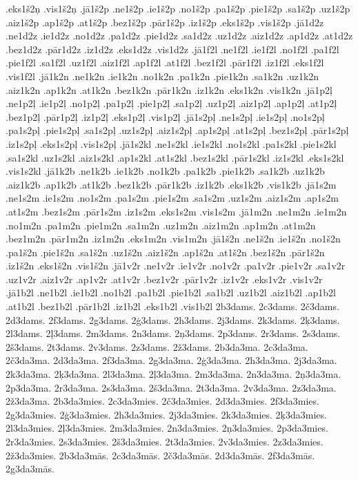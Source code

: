 {.eks1š2ņ
.vis1š2ņ
.jā1š2p
.ne1š2p
.ie1š2p
.no1š2p
.pa1š2p
.pie1š2p
.sa1š2p
.uz1š2p
.aiz1š2p
.ap1š2p
.at1š2p
.bez1š2p
.pār1š2p
.iz1š2p
.eks1š2p
.vis1š2p
.jā1d2z
.ne1d2z
.ie1d2z
.no1d2z
.pa1d2z
.pie1d2z
.sa1d2z
.uz1d2z
.aiz1d2z
.ap1d2z
.at1d2z
.bez1d2z
.pār1d2z
.iz1d2z
.eks1d2z
.vis1d2z
.jā1f2l
.ne1f2l
.ie1f2l
.no1f2l
.pa1f2l
.pie1f2l
.sa1f2l
.uz1f2l
.aiz1f2l
.ap1f2l
.at1f2l
.bez1f2l
.pār1f2l
.iz1f2l
.eks1f2l
.vis1f2l
.jā1k2n
.ne1k2n
.ie1k2n
.no1k2n
.pa1k2n
.pie1k2n
.sa1k2n
.uz1k2n
.aiz1k2n
.ap1k2n
.at1k2n
.bez1k2n
.pār1k2n
.iz1k2n
.eks1k2n
.vis1k2n
.jā1p2ļ
.ne1p2ļ
.ie1p2ļ
.no1p2ļ
.pa1p2ļ
.pie1p2ļ
.sa1p2ļ
.uz1p2ļ
.aiz1p2ļ
.ap1p2ļ
.at1p2ļ
.bez1p2ļ
.pār1p2ļ
.iz1p2ļ
.eks1p2ļ
.vis1p2ļ
.jā1s2pļ
.ne1s2pļ
.ie1s2pļ
.no1s2pļ
.pa1s2pļ
.pie1s2pļ
.sa1s2pļ
.uz1s2pļ
.aiz1s2pļ
.ap1s2pļ
.at1s2pļ
.bez1s2pļ
.pār1s2pļ
.iz1s2pļ
.eks1s2pļ
.vis1s2pļ
.jā1s2kl
.ne1s2kl
.ie1s2kl
.no1s2kl
.pa1s2kl
.pie1s2kl
.sa1s2kl
.uz1s2kl
.aiz1s2kl
.ap1s2kl
.at1s2kl
.bez1s2kl
.pār1s2kl
.iz1s2kl
.eks1s2kl
.vis1s2kl
.jā1k2b
.ne1k2b
.ie1k2b
.no1k2b
.pa1k2b
.pie1k2b
.sa1k2b
.uz1k2b
.aiz1k2b
.ap1k2b
.at1k2b
.bez1k2b
.pār1k2b
.iz1k2b
.eks1k2b
.vis1k2b
.jā1s2m
.ne1s2m
.ie1s2m
.no1s2m
.pa1s2m
.pie1s2m
.sa1s2m
.uz1s2m
.aiz1s2m
.ap1s2m
.at1s2m
.bez1s2m
.pār1s2m
.iz1s2m
.eks1s2m
.vis1s2m
.jā1m2n
.ne1m2n
.ie1m2n
.no1m2n
.pa1m2n
.pie1m2n
.sa1m2n
.uz1m2n
.aiz1m2n
.ap1m2n
.at1m2n
.bez1m2n
.pār1m2n
.iz1m2n
.eks1m2n
.vis1m2n
.jā1š2n
.ne1š2n
.ie1š2n
.no1š2n
.pa1š2n
.pie1š2n
.sa1š2n
.uz1š2n
.aiz1š2n
.ap1š2n
.at1š2n
.bez1š2n
.pār1š2n
.iz1š2n
.eks1š2n
.vis1š2n
.jā1v2r
.ne1v2r
.ie1v2r
.no1v2r
.pa1v2r
.pie1v2r
.sa1v2r
.uz1v2r
.aiz1v2r
.ap1v2r
.at1v2r
.bez1v2r
.pār1v2r
.iz1v2r
.eks1v2r
.vis1v2r
.jā1b2l
.ne1b2l
.ie1b2l
.no1b2l
.pa1b2l
.pie1b2l
.sa1b2l
.uz1b2l
.aiz1b2l
.ap1b2l
.at1b2l
.bez1b2l
.pār1b2l
.iz1b2l
.eks1b2l
.vis1b2l
2b3dams.
2c3dams.
2č3dams.
2d3dams.
2f3dams.
2g3dams.
2ģ3dams.
2h3dams.
2j3dams.
2k3dams.
2ķ3dams.
2l3dams.
2ļ3dams.
2m3dams.
2n3dams.
2ņ3dams.
2p3dams.
2r3dams.
2s3dams.
2š3dams.
2t3dams.
2v3dams.
2z3dams.
2ž3dams.
2b3da3ma.
2c3da3ma.
2č3da3ma.
2d3da3ma.
2f3da3ma.
2g3da3ma.
2ģ3da3ma.
2h3da3ma.
2j3da3ma.
2k3da3ma.
2ķ3da3ma.
2l3da3ma.
2ļ3da3ma.
2m3da3ma.
2n3da3ma.
2ņ3da3ma.
2p3da3ma.
2r3da3ma.
2s3da3ma.
2š3da3ma.
2t3da3ma.
2v3da3ma.
2z3da3ma.
2ž3da3ma.
2b3da3mies.
2c3da3mies.
2č3da3mies.
2d3da3mies.
2f3da3mies.
2g3da3mies.
2ģ3da3mies.
2h3da3mies.
2j3da3mies.
2k3da3mies.
2ķ3da3mies.
2l3da3mies.
2ļ3da3mies.
2m3da3mies.
2n3da3mies.
2ņ3da3mies.
2p3da3mies.
2r3da3mies.
2s3da3mies.
2š3da3mies.
2t3da3mies.
2v3da3mies.
2z3da3mies.
2ž3da3mies.
2b3da3mās.
2c3da3mās.
2č3da3mās.
2d3da3mās.
2f3da3mās.
2g3da3mās.
}
